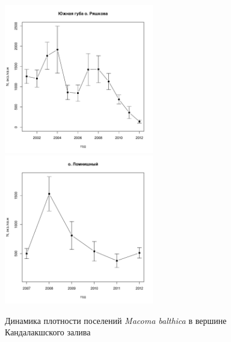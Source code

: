 \documentclass[12pt, a4paper]{article}
\begin{document}
\begin{figure}[h]

\begin{multicols}{2}
\hfill
\includegraphics[width=65mm]{../White_Sea/Ryashkov_YuG/N_dynamic.pdf}
\hfill
\includegraphics[width=65mm]{../White_Sea/Lomnishniy/N_dynamic.pdf}
\end{multicols}



\caption{Динамика плотности поселений {\it Macoma balthica} в вершине Кандалакшского залива}
\label{ris:dynamic_Kandalaksha_all}
\end{figure}
\end{document}
